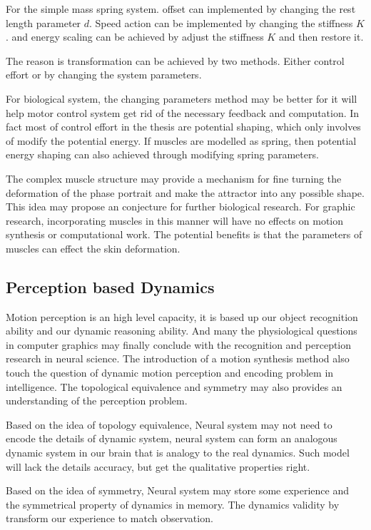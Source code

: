 For the simple  mass spring system.
offset can implemented by changing the rest length parameter $d$.
Speed action can be implemented by changing the stiffness $K$.
and energy scaling can be achieved by adjust the stiffness $K$ and then restore it.
 

The reason is transformation can be achieved by two methods.
Either control effort or by changing the system parameters.

For biological system, the changing parameters method may be better for it will help motor control system get rid of the necessary feedback and computation. 
In fact most of control effort in the thesis are potential shaping, which only involves of modify the potential energy.
If muscles are modelled as spring, then potential energy shaping can also achieved through modifying spring parameters.

The complex muscle structure may provide a mechanism for fine turning the deformation of the phase portrait and make the attractor into any possible shape.
This idea may propose an conjecture for further biological research.
For graphic research, incorporating muscles in this manner will have no effects on motion synthesis or computational work.
The potential benefits is that the parameters of muscles can effect the skin deformation.



\subsection{Perception based Dynamics}
Motion perception is an high level capacity, it is based up our object recognition ability and our dynamic reasoning ability.
And many the physiological questions in computer graphics may finally conclude with the recognition and perception research in neural science.
The introduction of a motion synthesis method also touch the question of dynamic motion perception and encoding problem in intelligence.
The topological equivalence and symmetry may also provides an understanding of the perception problem.

Based on the idea of topology equivalence,
Neural system may not need to encode the details of dynamic system, neural system can form an analogous dynamic system in our brain that is analogy to the real dynamics.
Such model will lack the details accuracy, but get the qualitative properties right.

Based on the idea of symmetry,
Neural system may store some experience and the symmetrical property of dynamics in memory.
The dynamics validity by transform our experience to match observation.


